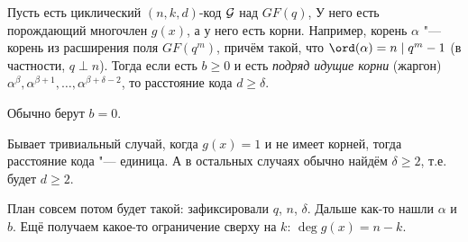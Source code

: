 \begin{theorem}
	Пусть есть циклический $(n, k, d)$-код $\cal G$ над $GF(q)$,
	У него есть порождающий многочлен $g(x)$, а у него есть корни.
	Например, корень $\alpha$ "--- корень из расширения поля $GF(q^m)$,
	причём такой, что $\ord (\alpha) = n \mid q^m-1$ (в частности, $q \perp n$).
	Тогда если есть $b \ge 0$ и есть \textit{подряд идущие корни} (жаргон)
	$\alpha^\beta, \alpha^{\beta+1}, \dots, \alpha^{\beta+\delta-2}$,
	то расстояние кода $d \ge \delta$.
\end{theorem}
\begin{Rem}
	Обычно берут $b=0$.
\end{Rem}
\begin{Rem}
	Бывает тривиальный случай, когда $g(x)=1$ и не имеет корней,
	тогда расстояние кода "--- единица.
	А в остальных случаях обычно найдём $\delta \ge 2$,
	т.е. будет $d \ge 2$.
\end{Rem}
\begin{Rem}
	План совсем потом будет такой: зафиксировали $q$, $n$, $\delta$.
	Дальше как-то нашли $\alpha$ и $b$.
	Ещё получаем какое-то ограничение сверху на $k$: $\deg g(x)=n-k$.
\end{Rem}
